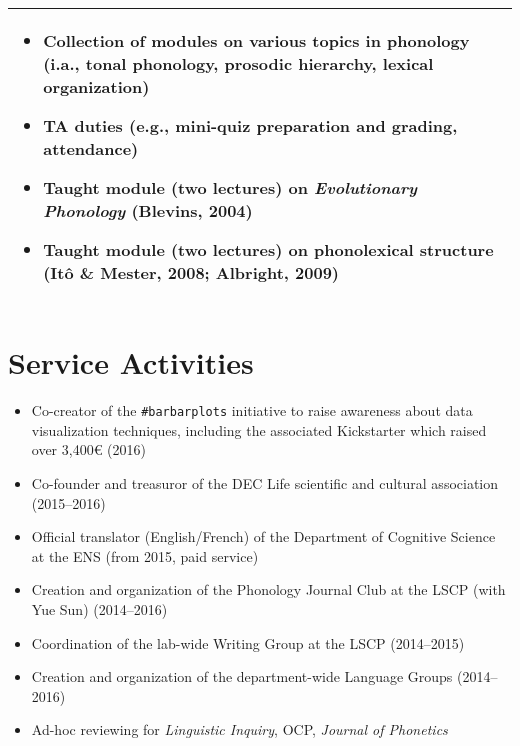 \documentclass[a4paper, 10pt]{article}
\begin{document}
\begin{center}
\begin{tabular}{|p{16cm}|}
\begin{itemize}[noitemsep]
\item Collection of modules on various topics in phonology (i.a.,
  tonal phonology, prosodic hierarchy, lexical organization)

\item TA duties (e.g., mini-quiz preparation and grading, attendance)

\item Taught module (two lectures) on \emph{Evolutionary
    Phonology} (Blevins, 2004) 

\item Taught module (two lectures) on phonolexical structure (Itô \&
  Mester, 2008; Albright, 2009)        

\end{itemize}\\

\hline
\end{tabular}



\end{center}


\section*{Service Activities}

\begin{itemize}
\RaggedRight

\item Co-creator of the \texttt{\#barbarplots} initiative to raise
  awareness about data visualization techniques, including the
  associated Kickstarter which raised over 3,400€ (2016)

\item Co-founder and treasuror of the DEC Life scientific and cultural
  association (2015--2016)

\item Official translator (English/French) of the Department of Cognitive Science at
  the ENS (from 2015, paid service)

\item Creation and organization of the Phonology Journal Club at the
  LSCP (with Yue Sun) (2014--2016)

\item Coordination of the lab-wide Writing Group at the LSCP (2014--2015)

\item Creation and organization of the department-wide Language Groups
  (2014--2016)

\item Ad-hoc reviewing for \emph{Linguistic Inquiry}, OCP,
  \emph{Journal of Phonetics}


\end{itemize}
\end{document}
